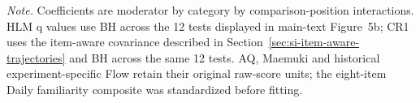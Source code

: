 \noindent\begin{minipage}{\textwidth}\footnotesize\textit{Note.} Coefficients are moderator by category by comparison-position interactions. HLM q values use BH across the 12 tests displayed in main-text Figure~5b; CR1 uses the item-aware covariance described in Section~\ref{sec:si-item-aware-trajectories} and BH across the same 12 tests. AQ, Maemuki and historical experiment-specific Flow retain their original raw-score units; the eight-item Daily familiarity composite was standardized before fitting.\end{minipage}
\endgroup
